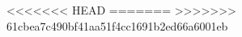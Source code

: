 <<<<<<< HEAD
\gdef\therev{22e34f7}
\gdef\thedate{2017-01-02 18:56:45 -0800}
=======
\gdef\therev{6776eeb}
\gdef\thedate{2017-01-10 11:40:45 -0800}
>>>>>>> 61cbea7c490bf41aa51f4cc1691b2ed66a6001eb

